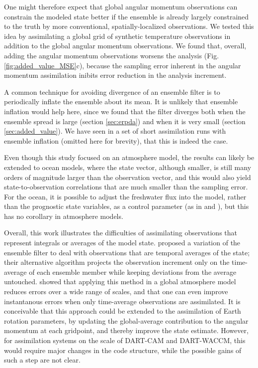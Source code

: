 One might therefore expect that global angular momentum observations can constrain the modeled state better if the ensemble is already largely constrained to the truth by more conventional, spatially-localized observations. 
We tested this idea by assimilating a global grid of synthetic temperature observations in addition to the global angular momentum observations. 
We found that, overall, adding the angular momentum observations worsens the analysis (Fig. \ref{fig:added_value_MSE}c), 
because the sampling error inherent in the angular momentum assimilation inibits error reduction in the analysis increment. 

A common technique for avoiding divergence of an ensemble filter is to periodically inflate the ensemble about its mean. 
It is unlikely that ensemble inflation would help here, since we found that the filter diverges both when the ensemble spread is large (section \ref{sec:erpda}) and when it is very small (section \ref{sec:added_value}). 
We have seen in a set of short assimilation runs with ensemble inflation (omitted here for brevity), that this is indeed the case. 


Even though this study focused on an atmosphere model, the results can likely be extended to ocean models, where the state vector, although smaller, is still many orders of magnitude larger than the observation vector, and this would also yield state-to-observation correlations that are much smaller than the sampling error. 
For the ocean, it is possible to adjust the freshwater flux into the model, rather than the prognostic state variables, as a control parameter (as in \citet{Saynisch2010} and \citet{Saynisch2012}), but this has no corollary in atmosphere models. 


Overall, this work illustrates the difficulties of assimilating observations that represent integrals or averages of the model state. 
\citet{Dirren2005} proposed a variation of the ensemble filter to deal with observations that are temporal averages of the state; their alternative algorithm projects the observation increment only on the time-average of each ensemble member while keeping deviations from the average untouched. 
\citet{Huntley2009} showed that applying this method in a global atmosphere model reduces errors over a wide range of scales, and that one can even improve instantanous errors when only time-average observations are assimilated. 
It is conceivable that this approach could be extended to the assimilation of Earth rotation parameters, by updating the global-average contribution to the angular momentum at each gridpoint, and thereby improve the state estimate. 
However, for assimilation systems on the scale of DART-CAM and DART-WACCM, this would require major changes in the code structure, while the possible gains of such a step are not clear. 


